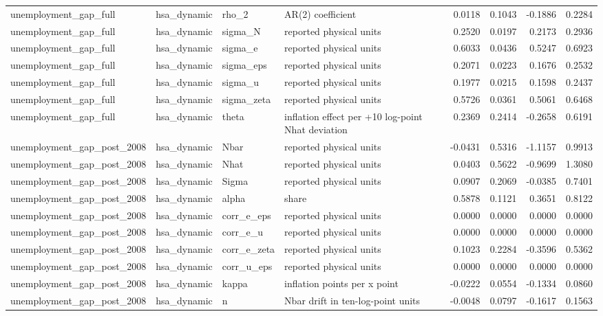 \begin{tabular}{llllrrrr}
unemployment\_gap\_full & hsa\_dynamic & rho\_2 & AR(2) coefficient & 0.0118 & 0.1043 & -0.1886 & 0.2284 \\
unemployment\_gap\_full & hsa\_dynamic & sigma\_N & reported physical units & 0.2520 & 0.0197 & 0.2173 & 0.2936 \\
unemployment\_gap\_full & hsa\_dynamic & sigma\_e & reported physical units & 0.6033 & 0.0436 & 0.5247 & 0.6923 \\
unemployment\_gap\_full & hsa\_dynamic & sigma\_eps & reported physical units & 0.2071 & 0.0223 & 0.1676 & 0.2532 \\
unemployment\_gap\_full & hsa\_dynamic & sigma\_u & reported physical units & 0.1977 & 0.0215 & 0.1598 & 0.2437 \\
unemployment\_gap\_full & hsa\_dynamic & sigma\_zeta & reported physical units & 0.5726 & 0.0361 & 0.5061 & 0.6468 \\
unemployment\_gap\_full & hsa\_dynamic & theta & inflation effect per +10 log-point Nhat deviation & 0.2369 & 0.2414 & -0.2658 & 0.6191 \\
unemployment\_gap\_post\_2008 & hsa\_dynamic & Nbar & reported physical units & -0.0431 & 0.5316 & -1.1157 & 0.9913 \\
unemployment\_gap\_post\_2008 & hsa\_dynamic & Nhat & reported physical units & 0.0403 & 0.5622 & -0.9699 & 1.3080 \\
unemployment\_gap\_post\_2008 & hsa\_dynamic & Sigma & reported physical units & 0.0907 & 0.2069 & -0.0385 & 0.7401 \\
unemployment\_gap\_post\_2008 & hsa\_dynamic & alpha & share & 0.5878 & 0.1121 & 0.3651 & 0.8122 \\
unemployment\_gap\_post\_2008 & hsa\_dynamic & corr\_e\_eps & reported physical units & 0.0000 & 0.0000 & 0.0000 & 0.0000 \\
unemployment\_gap\_post\_2008 & hsa\_dynamic & corr\_e\_u & reported physical units & 0.0000 & 0.0000 & 0.0000 & 0.0000 \\
unemployment\_gap\_post\_2008 & hsa\_dynamic & corr\_e\_zeta & reported physical units & 0.1023 & 0.2284 & -0.3596 & 0.5362 \\
unemployment\_gap\_post\_2008 & hsa\_dynamic & corr\_u\_eps & reported physical units & 0.0000 & 0.0000 & 0.0000 & 0.0000 \\
unemployment\_gap\_post\_2008 & hsa\_dynamic & kappa & inflation points per x point & -0.0222 & 0.0554 & -0.1334 & 0.0860 \\
unemployment\_gap\_post\_2008 & hsa\_dynamic & n & Nbar drift in ten-log-point units & -0.0048 & 0.0797 & -0.1617 & 0.1563 \\

\end{tabular}
